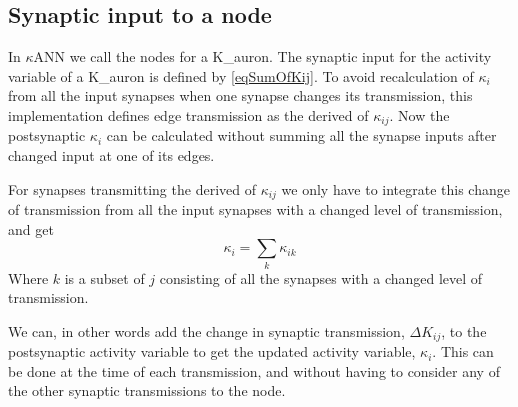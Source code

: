 		\subsection{Synaptic input to a node}
			\label{ssecSynInputToANode}
			In $\kappa$ANN we call the nodes for a K\_auron.
			The synaptic input for the activity variable of a K\_auron is defined by \eqref{eqSumOfKij}.
			To avoid recalculation of $\kappa_i$ from all the input synapses when one synapse changes its transmission, this implementation defines edge transmission as the derived of $\kappa_{ij}$.
			Now the postsynaptic $\kappa_i$ can be calculated without summing all the synapse inputs after changed input at one of its edges.

			For synapses transmitting the derived of $\kappa_{ij}$ we only have to integrate this change of transmission from all the input synapses with a changed level of transmission, and get
			\begin{equation}
				\kappa_i = \sum_k{\kappa_{ik}}
			\end{equation}
			Where ${k}$ is a subset of ${j}$ consisting of all the synapses with a changed level of transmission.

			We can, in other words add the change in synaptic transmission, $\Delta K_{ij}$, to the postsynaptic activity variable to get the updated activity variable, $\kappa_i$.
			This can be done at the time of each transmission, and without having to consider any of the other synaptic transmissions to the node.
			


